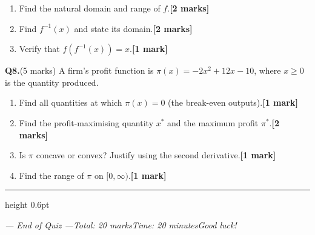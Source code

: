 \documentclass[11pt]{article}
\begin{document}
\medskip
\begin{enumerate}[label=\textbf{(\alph*)},leftmargin=2em,itemsep=1.5em]
  \item Find the natural domain and range of $f$.\hfill\textbf{[2 marks]}

     

  \item Find $f^{-1}(x)$ and state its domain.\hfill\textbf{[2 marks]}

       

  \item Verify that $f\!\left(f^{-1}(x)\right) = x$.\hfill\textbf{[1 mark]}

         
\end{enumerate}

\newpage

\noindent\textbf{Q8.}\quad(5 marks)\enspace
A firm's profit function is $\pi(x) = -2x^{2} + 12x - 10$,
where $x \geq 0$ is the quantity produced.

\medskip
\begin{enumerate}[label=\textbf{(\alph*)},leftmargin=2em,itemsep=1.5em]
  \item Find all quantities at which $\pi(x) = 0$ (the break-even outputs).\hfill\textbf{[1 mark]}

     

  \item Find the profit-maximising quantity $x^{*}$ and the maximum profit $\pi^{*}$.\hfill\textbf{[2 marks]}

        

  \item Is $\pi$ concave or convex? Justify using the second derivative.\hfill\textbf{[1 mark]}

      

  \item Find the range of $\pi$ on $[0,\infty)$.\hfill\textbf{[1 mark]}

       
\end{enumerate}

\vspace{1em}
{\hrule height 0.6pt}
\begin{center}
\small\itshape
--- End of Quiz ---\qquad Total: 20 marks\qquad Time: 20 minutes\qquad Good luck!
\end{center}
\end{document}
